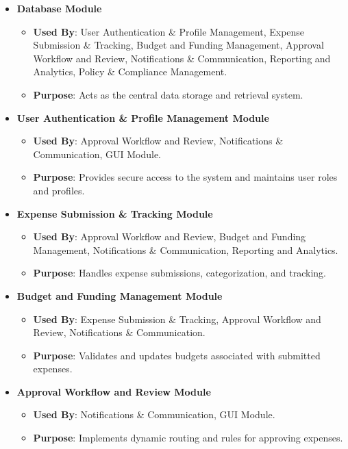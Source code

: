 \documentclass[12pt, titlepage]{article}
\begin{document}
\begin{itemize}
    \item \textbf{Database Module}
    \begin{itemize}
        \item \textbf{Used By}: 
        User Authentication \& Profile Management, Expense Submission \& Tracking, Budget and Funding Management, Approval Workflow and Review, Notifications \& Communication, Reporting and Analytics, Policy \& Compliance Management.
        \item \textbf{Purpose}: Acts as the central data storage and retrieval system.
    \end{itemize}
    
    \item \textbf{User Authentication \& Profile Management Module}
    \begin{itemize}
        \item \textbf{Used By}: Approval Workflow and Review, Notifications \& Communication, GUI Module.
        \item \textbf{Purpose}: Provides secure access to the system and maintains user roles and profiles.
    \end{itemize}
    
    \item \textbf{Expense Submission \& Tracking Module}
    \begin{itemize}
        \item \textbf{Used By}: Approval Workflow and Review, Budget and Funding Management, Notifications \& Communication, Reporting and Analytics.
        \item \textbf{Purpose}: Handles expense submissions, categorization, and tracking.
    \end{itemize}
    
    \item \textbf{Budget and Funding Management Module}
    \begin{itemize}
        \item \textbf{Used By}: Expense Submission \& Tracking, Approval Workflow and Review, Notifications \& Communication.
        \item \textbf{Purpose}: Validates and updates budgets associated with submitted expenses.
    \end{itemize}
    
    \item \textbf{Approval Workflow and Review Module}
    \begin{itemize}
        \item \textbf{Used By}: Notifications \& Communication, GUI Module.
        \item \textbf{Purpose}: Implements dynamic routing and rules for approving expenses.
    \end{itemize}
    

\end{itemize}
\end{document}
